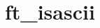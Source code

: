 \chapter{ft\+\_\+isascii}
\hypertarget{md_Documentation_2ft__isascii}{}\label{md_Documentation_2ft__isascii}
